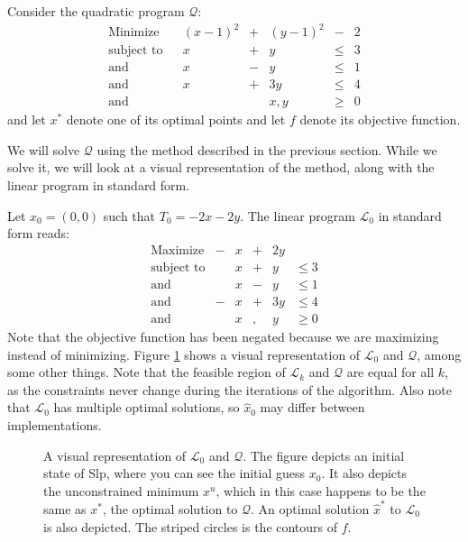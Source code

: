 Consider the quadratic program $\mathcal{Q}$:
\[
\begin{array}{lcrcrcr}
\textrm{Minimize}           & &   (x-1)^2 &+&   (y-1)^2 & - &  2 \\
\textrm{subject to}         & &         x &+&         y &\leq& 3 \\
\textrm{and}                & &         x &-&         y &\leq& 1 \\
\textrm{and}                & &         x &+&       3 y &\leq& 4 \\
\textrm{and}                & &           & &       x,y &\geq& 0
\end{array}
\]
and let $x^*$ denote one of its optimal points and let $f$ denote its objective
function.

We will solve $\mathcal{Q}$ using the method described in the previous
section. While we solve it, we will look at a visual representation of the
method, along with the linear program in standard form.

Let $x_0 = (0,0)$ such that $T_0 = -2x - 2y$. The linear program
$\mathcal{L}_0$ in standard form reads:
\[
\begin{array}{lcrcrl}
    \textrm{Maximize}   &-&   x &+& 2 y \\
    \textrm{subject to} & &   x &+&   y & \leq 3 \\
    \textrm{and}        & &   x &-&   y & \leq 1 \\
    \textrm{and}        &-&   x &+& 3 y & \leq 4 \\
    \textrm{and}        & &   x &,&   y & \geq 0
\end{array}
\]
Note that the objective function has been negated because we are maximizing
instead of minimizing.
Figure \ref{fig:lp1} shows a visual representation of $\mathcal{L}_0$ and
$\mathcal{Q}$, among some other things.
Note that the feasible region of $\mathcal{L}_k$ and
$\mathcal{Q}$ are equal for all $k$, as the constraints never change during the
iterations of the algorithm. Also note that $\mathcal{L}_0$ has multiple
optimal solutions, so $\hat{x}_0$ may differ between implementations.

\begin{figure}[ht!]
    \centering
    
    \caption{A visual representation of $\mathcal{L}_0$ and $\mathcal{Q}$.
             The figure depicts an initial state
             of Slp, where you can see the initial guess $x_0$. It also
             depicts the unconstrained minimum $x^u$, which in this case
             happens to be the same as $x^*$, the optimal solution to
             $\mathcal{Q}$. An optimal solution $\hat{x}^*$ to $\mathcal{L}_0$
             is also depicted. The striped circles is the contours of $f$.}
    \label{fig:lp1}
\end{figure}

